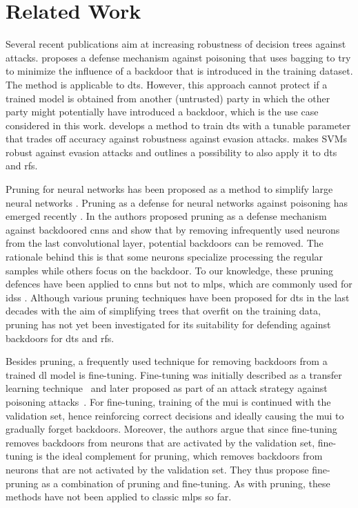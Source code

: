 \documentclass[9pt,sigconf,letterpaper,dvipsnames\ifx\removeHeaders\tempYes ,nonacm\fi]{acmart}
\newcommand\note[2]{{\color{#1}#2}}
\newcommand\todo[1]{{\note{red}{TODO: #1}}}
\begin{document}
\section{Related Work}

Several recent publications aim at
increasing robustness of decision trees against attacks. \cite{biggio_bagging_2011} proposes a defense mechanism against poisoning that uses bagging to try to minimize the influence of a backdoor that is introduced in the training dataset. The method is applicable to \glspl{dt}. However, this approach cannot protect if a trained model is obtained from another (untrusted) party in which the other party might potentially have introduced a backdoor, which is the use case considered in this work. \cite{chen_robust_2019} develops a method to train \glspl{dt} with a tunable parameter that trades off accuracy against robustness against evasion attacks. \cite{russu_secure_2016} makes SVMs robust against evasion attacks and outlines a possibility to also apply it to \glspl{dt} and \glspl{rf}.

Pruning for neural networks has been proposed
as a method to simplify large neural networks \cite{sietsma_neural_1988}.
Pruning as a defense for neural networks against poisoning has emerged recently \cite{gu_badnets:_2017}. In \cite{gu_badnets:_2017} the authors proposed pruning as a defense mechanism against backdoored \glspl{cnn} and show that by removing infrequently used neurons from the last convolutional layer, potential backdoors can be removed. The rationale behind this is that some neurons specialize processing the regular samples while others focus on the backdoor.
To our knowledge, these pruning defences have been applied to \glspl{cnn} but not to \glspl{mlp}, which are commonly used for \glspl{ids} \cite{meghdouri_analysis_2018}. Although various pruning techniques have been proposed for \glspl{dt} in the last decades \cite{esposito_comparative_1997} with the aim of simplifying trees that overfit on the training data, pruning has not yet been investigated for its suitability for defending against backdoors for \glspl{dt} and \glspl{rf}.

Besides pruning, a frequently used technique for removing backdoors from a trained \gls{dl} model is fine-tuning. Fine-tuning was initially described as a transfer learning technique~\cite{yosinski_how_2014} and later proposed as part of an attack strategy against poisoning attacks~\cite{liu_fine-pruning:_2018}. For fine-tuning, training of the \gls{mui} is continued with the validation set, hence reinforcing correct decisions and ideally causing the \gls{mui} to gradually forget backdoors. Moreover, the authors argue that since fine-tuning removes backdoors from neurons that are activated by the validation set, fine-tuning is the ideal complement for pruning, which removes backdoors from neurons that are not activated by the validation set. They thus propose fine-pruning as a combination of pruning and fine-tuning. As with pruning, these methods have not been applied to classic \glspl{mlp} so far.
\end{document}
